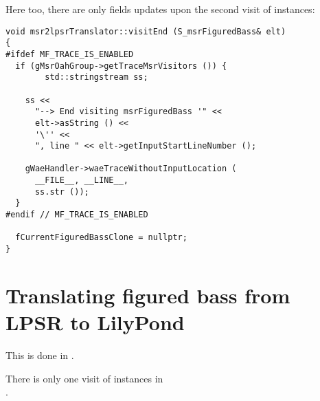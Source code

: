 Here too, there are only fields updates upon the second visit of  instances:
\begin{lstlisting}[language=CPlusPlus]
void msr2lpsrTranslator::visitEnd (S_msrFiguredBass& elt)
{
#ifdef MF_TRACE_IS_ENABLED
  if (gMsrOahGroup->getTraceMsrVisitors ()) {
		std::stringstream ss;

    ss <<
      "--> End visiting msrFiguredBass '" <<
      elt->asString () <<
      '\'' <<
      ", line " << elt->getInputStartLineNumber ();

    gWaeHandler->waeTraceWithoutInputLocation (
      __FILE__, __LINE__,
      ss.str ());
  }
#endif // MF_TRACE_IS_ENABLED

  fCurrentFiguredBassClone = nullptr;
}
\end{lstlisting}


\section{Translating figured bass from LPSR to LilyPond}

This is done in \lpsrToLilypond{}.

There is only one visit of  instances in\\
.

